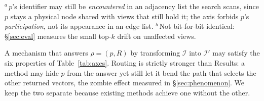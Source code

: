 \documentclass[sigconf, nonacm, review]{acmart}
\begin{document}
\begin{table}[t]
\centering
\small
\setlength{\tabcolsep}{5pt}
\renewcommand{\arraystretch}{1.2}
\caption{The six axes of per-view erasure (Definition~\ref{def:pve}): each
names a way a revoked vector $p$ can persist after a request $\rho=(p,R)$
transforms the index $\mathcal{I}$ into $\mathcal{I}'$ with store $S'$. $\mathrm{Ans}$ and $\mathrm{Visit}$ are the answer and visited sets of
\S\ref{sec:background}; $R{=}U$ is global erasure.}
\label{tab:axes}

\vspace{2pt}
{\footnotesize $^{a}$\,$p$'s identifier may still be \emph{encountered} in an
adjacency list the search scans, since $p$ stays a physical node shared with
views that still hold it; the axis forbids $p$'s \emph{participation}, not its
appearance in an edge list.\quad
$^{b}$\,Not bit-for-bit identical: \S\ref{sec:eval} measures the small
top-$k$ drift on unaffected views.}
\end{table}

A mechanism that answers $\rho=(p,R)$ by transforming $\mathcal{I}$ into
$\mathcal{I}'$ may satisfy the six properties of Table~\ref{tab:axes}.
Routing is strictly stronger than Results: a method may hide $p$ from the
answer yet still let it bend the path that selects the other returned
vectors, the zombie effect measured in \S\ref{sec:phenomenon}. We
keep the two separate because existing methods achieve one without the
other.
\end{document}
